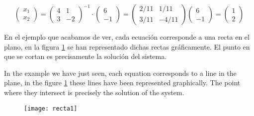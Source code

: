 \begin{equation*}
\begin{pmatrix}
x_1\\
x_2
\end{pmatrix}= \begin{pmatrix}
4& 1\\
3& -2
\end{pmatrix}^{-1} \cdot \begin{pmatrix}
6\\
-1
\end{pmatrix}=\begin{pmatrix}
2/11& 1/11\\
3/11& -4/11
\end{pmatrix}\begin{pmatrix}
6\\
-1
\end{pmatrix}=\begin{pmatrix}
1\\
2
\end{pmatrix}
\end{equation*}

\begin{paracol}{2}
En el ejemplo que acabamos de ver, cada ecuación corresponde a una recta en el plano, en la figura \ref{fig:recta1} se han representado dichas rectas gráficamente. El punto en que se cortan es precisamente la solución del sistema.

\switchcolumn
In the example we have just seen, each equation corresponds to a line in the plane, in the figure \ref{fig:recta1} these lines have been represented graphically. The point where they intersect is precisely the solution of the system.

\end{paracol}
\begin{figure}[h]
\centering
\texttt{[image: recta1]}
\label{fig:recta1}
\end{figure}

